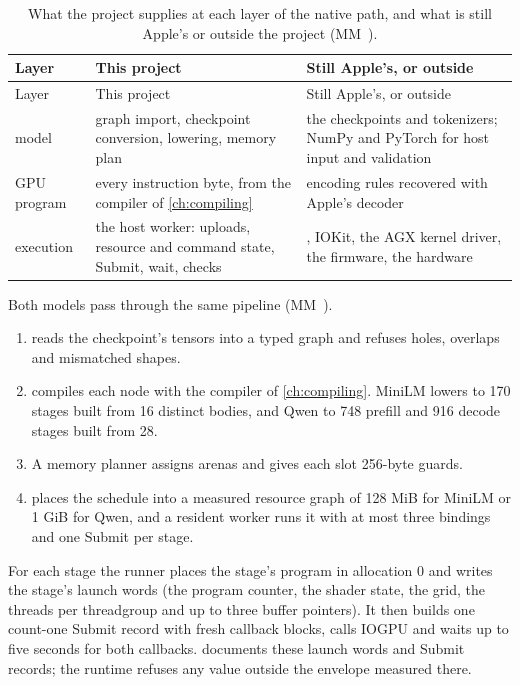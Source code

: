 \begin{xltabular}{\linewidth}{@{}lXX@{}}
\caption{What the project supplies at each layer of the native path, and what is still Apple's or outside the project (MM~).}\label{tab:native-path-ownership}\\
\toprule
Layer & This project & Still Apple's, or outside \\
\midrule
\endfirsthead
{}
\toprule
Layer & This project & Still Apple's, or outside \\
\midrule
\endhead
model & graph import, checkpoint conversion, lowering, memory plan & the checkpoints and tokenizers; NumPy and PyTorch for host input and
validation \\*
GPU program & every instruction byte, from the compiler of \cref{ch:compiling} & encoding rules recovered with Apple's decoder \\*
execution & the host worker: uploads, resource and command state, Submit, wait,
checks & , IOKit, the AGX kernel driver, the firmware, the
hardware \\*
\bottomrule
\end{xltabular}

Both models pass through the same pipeline (MM~).

\begin{enumerate}
\def\labelenumi{\arabic{enumi}.}
\item {} reads the checkpoint's tensors into a typed graph and refuses holes,
  overlaps and mismatched shapes.
\item {} compiles each node with the compiler of \cref{ch:compiling}. MiniLM lowers to
  170 stages built from 16 distinct bodies, and Qwen to 748 prefill and 916 decode stages built from 28.
\item A memory planner assigns arenas and gives each slot 256-byte guards.
\item {} places the schedule into a measured resource graph of 128 MiB for MiniLM or
  1 GiB for Qwen, and a resident worker runs it with at most three bindings and one Submit per stage.
\end{enumerate}

For each stage the runner places the stage's program in allocation 0 and writes the stage's launch words (the program
counter, the shader state, the grid, the threads per threadgroup and up to three buffer pointers). It then builds one
count-one Submit record with fresh callback blocks, calls IOGPU and waits up to five seconds for both callbacks.
 documents these launch words and Submit records; the runtime refuses any value
outside the envelope measured there.

